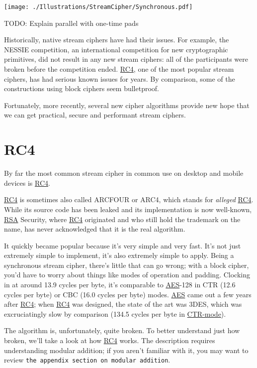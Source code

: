 \documentclass[11pt,ebook,table,dvipsnames]{memoir}
\begin{document}
\texttt{[image: ./Illustrations/StreamCipher/Synchronous.pdf]}

TODO: Explain parallel with one-time pads

Historically, native stream ciphers have had their issues. For
example, the NESSIE competition, an international competition for new
cryptographic primitives, did not result in any new stream ciphers:
all of the participants were broken before the competition ended. \hyperref[RC4]{RC4},
one of the most popular stream ciphers, has had serious known issues
for years. By comparison, some of the constructions using block
ciphers seem bulletproof.

Fortunately, more recently, several new cipher algorithms provide new
hope that we can get practical, secure and performant stream ciphers.
\section{\label{RC4}RC4}
\label{sec-2-3-11}

By far the most common \gls{stream cipher} in common use on desktop
and mobile devices is \hyperref[RC4]{RC4}.

\hyperref[RC4]{RC4} is sometimes also called ARCFOUR or ARC4, which stands for
\emph{alleged} \hyperref[RC4]{RC4}. While its source code has been leaked and its
implementation is now well-known, \hyperref[RSA]{RSA} Security, where \hyperref[RC4]{RC4} originated
and who still hold the trademark on the name, has never acknowledged
that it is the real algorithm.

It quickly became popular because it's very simple and very fast. It's
not just extremely simple to implement, it's also extremely simple to
apply. Being a synchronous stream cipher, there's little that can go
wrong; with a block cipher, you'd have to worry about things like
modes of operation and padding. Clocking in at around 13.9 cycles per
byte, it's comparable to \hyperref[AES]{AES}-128 in CTR (12.6 cycles per byte) or CBC
(16.0 cycles per byte) modes. \hyperref[AES]{AES} came out a few years after \hyperref[RC4]{RC4}; when
\hyperref[RC4]{RC4} was designed, the state of the art was 3DES, which was
excruciatingly slow by comparison (134.5 cycles per byte in \hyperref[CTR mode]{CTR-mode}).
\cite{cryptopp:bench}

The algorithm is, unfortunately, quite broken. To better understand
just how broken, we'll take a look at how \hyperref[RC4]{RC4} works. The description
requires understanding modular addition; if you aren't familiar with
it, you may want to review \texttt{the appendix section on modular addition}.
\end{document}
